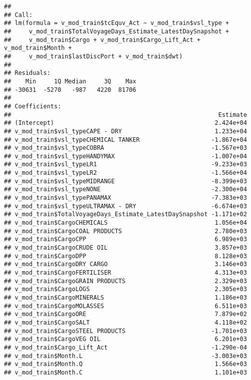 \documentclass[]{article}
\begin{document}
\begin{verbatim}
## 
## Call:
## lm(formula = v_mod_train$tcEquv_Act ~ v_mod_train$vsl_type + 
##     v_mod_train$TotalVoyageDays_Estimate_LatestDaySnapshot + 
##     v_mod_train$Cargo + v_mod_train$Cargo_Lift_Act + v_mod_train$Month + 
##     v_mod_train$lastDiscPort + v_mod_train$dwt)
## 
## Residuals:
##    Min     1Q Median     3Q    Max 
## -30631  -5270   -987   4220  81706 
## 
## Coefficients:
##                                                          Estimate
## (Intercept)                                             2.424e+04
## v_mod_train$vsl_typeCAPE - DRY                          1.233e+04
## v_mod_train$vsl_typeCHEMICAL TANKER                    -1.867e+04
## v_mod_train$vsl_typeCOBRA                              -1.567e+03
## v_mod_train$vsl_typeHANDYMAX                           -1.007e+04
## v_mod_train$vsl_typeLR1                                -9.233e+03
## v_mod_train$vsl_typeLR2                                -1.566e+04
## v_mod_train$vsl_typeMIDRANGE                           -8.399e+03
## v_mod_train$vsl_typeNONE                               -2.300e+04
## v_mod_train$vsl_typePANAMAX                            -7.383e+03
## v_mod_train$vsl_typeULTRAMAX - DRY                     -6.674e+03
## v_mod_train$TotalVoyageDays_Estimate_LatestDaySnapshot -1.171e+02
## v_mod_train$CargoCHEMICALS                              1.056e+04
## v_mod_train$CargoCOAL PRODUCTS                          2.780e+03
## v_mod_train$CargoCPP                                    6.989e+03
## v_mod_train$CargoCRUDE OIL                              3.857e+03
## v_mod_train$CargoDPP                                    8.128e+03
## v_mod_train$CargoDRY CARGO                              3.146e+03
## v_mod_train$CargoFERTILISER                             4.313e+03
## v_mod_train$CargoGRAIN PRODUCTS                         2.329e+03
## v_mod_train$CargoLOGS                                   2.305e+03
## v_mod_train$CargoMINERALS                               1.186e+03
## v_mod_train$CargoMOLASSES                               6.511e+03
## v_mod_train$CargoORE                                    7.879e+02
## v_mod_train$CargoSALT                                   4.118e+02
## v_mod_train$CargoSTEEL PRODUCTS                        -1.701e+03
## v_mod_train$CargoVEG OIL                                6.201e+03
## v_mod_train$Cargo_Lift_Act                             -1.290e-04
## v_mod_train$Month.L                                    -3.003e+03
## v_mod_train$Month.Q                                     1.566e+03
## v_mod_train$Month.C                                     1.101e+03

\end{verbatim}
\end{document}

